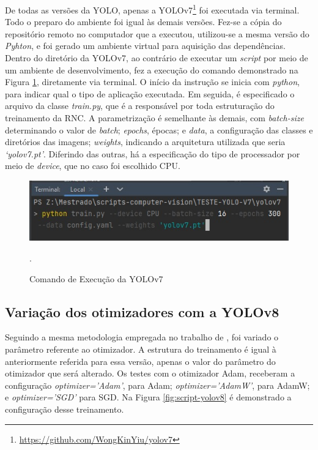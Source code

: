 De todas as versões da YOLO, apenas a YOLOv7\footnote{\url{https://github.com/WongKinYiu/yolov7}} foi executada via terminal. Todo o preparo do ambiente foi igual às demais versões. Fez-se a cópia do repositório remoto no computador que a executou, utilizou-se a mesma versão do \textit{Pyhton}, e foi gerado um ambiente virtual para aquisição das dependências. Dentro do diretório da YOLOv7, ao contrário de executar um \textit{script} por meio de um ambiente de desenvolvimento, fez a execução do comando demonstrado na Figura \ref{fig:script-yolov7}, diretamente via terminal. O início da instrução se inicia com \textit{python}, para indicar qual o tipo de aplicação executada. Em seguida, é especificado o arquivo da classe \textit{train.py}, que é a responsável por toda estruturação do treinamento da RNC.  A parametrização é semelhante às demais, com \textit{batch-size} determinando o valor de \textit{batch}; \textit{epochs}, épocas; e \textit{data}, a configuração das classes e diretórios das imagens; \textit{weights}, indicando a arquitetura utilizada que seria \textit{‘yolov7.pt’}. Diferindo das outras, há a especificação do tipo de processador por meio de \textit{device}, que no caso foi escolhido CPU.

\begin{figure}[!h]
    \centering
    \begin{minipage}{0.7\linewidth}
    \centering
    \captionsetup{justification=centering,margin=0.5cm,font=small}
    \includegraphics[width=1\linewidth]{img/cap5/script-yolov7.jpg}
    \caption{Comando de Execução da YOLOv7}.
    \label{fig:script-yolov7}
    \end{minipage}
\end{figure}

\subsection{Variação dos otimizadores com a YOLOv8}

Seguindo a mesma metodologia empregada no trabalho de \cite{gonzaga2023identificaccao}, foi variado o parâmetro referente ao otimizador. A estrutura do treinamento é igual à anteriormente referida para essa versão, apenas o valor do parâmetro do otimizador que será alterado. Os testes com o otimizador Adam, receberam a configuração \textit{optimizer=’Adam’}, para Adam; \textit{optimizer=’AdamW’}, para AdamW; e \textit{optimizer=’SGD’} para SGD. Na Figura \ref{fig:script-yolov8} é demonstrado a configuração desse treinamento.

